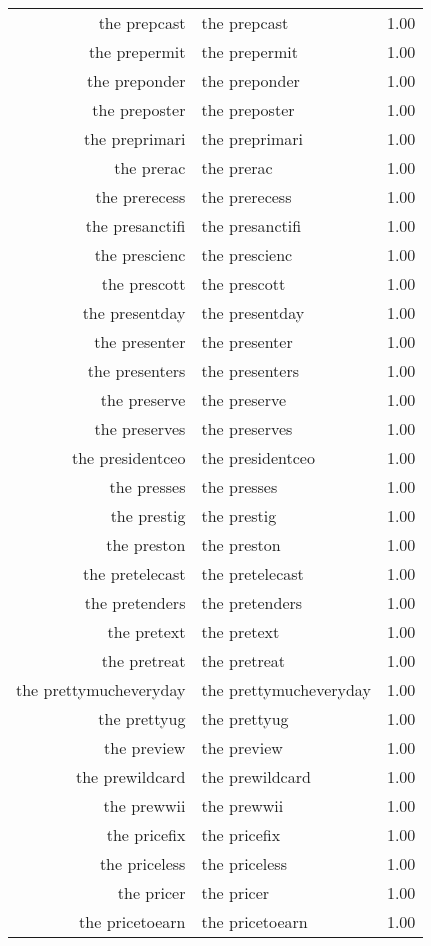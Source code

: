 \begin{table}[ht]
\begin{tabular}{rlr}
  the prepcast & the prepcast & 1.00 \\ 
  the prepermit & the prepermit & 1.00 \\ 
  the preponder & the preponder & 1.00 \\ 
  the preposter & the preposter & 1.00 \\ 
  the preprimari & the preprimari & 1.00 \\ 
  the prerac & the prerac & 1.00 \\ 
  the prerecess & the prerecess & 1.00 \\ 
  the presanctifi & the presanctifi & 1.00 \\ 
  the prescienc & the prescienc & 1.00 \\ 
  the prescott & the prescott & 1.00 \\ 
  the presentday & the presentday & 1.00 \\ 
  the presenter & the presenter & 1.00 \\ 
  the presenters & the presenters & 1.00 \\ 
  the preserve & the preserve & 1.00 \\ 
  the preserves & the preserves & 1.00 \\ 
  the presidentceo & the presidentceo & 1.00 \\ 
  the presses & the presses & 1.00 \\ 
  the prestig & the prestig & 1.00 \\ 
  the preston & the preston & 1.00 \\ 
  the pretelecast & the pretelecast & 1.00 \\ 
  the pretenders & the pretenders & 1.00 \\ 
  the pretext & the pretext & 1.00 \\ 
  the pretreat & the pretreat & 1.00 \\ 
  the prettymucheveryday & the prettymucheveryday & 1.00 \\ 
  the prettyug & the prettyug & 1.00 \\ 
  the preview & the preview & 1.00 \\ 
  the prewildcard & the prewildcard & 1.00 \\ 
  the prewwii & the prewwii & 1.00 \\ 
  the pricefix & the pricefix & 1.00 \\ 
  the priceless & the priceless & 1.00 \\ 
  the pricer & the pricer & 1.00 \\ 
  the pricetoearn & the pricetoearn & 1.00 \\ 

\end{tabular}
\end{table}
